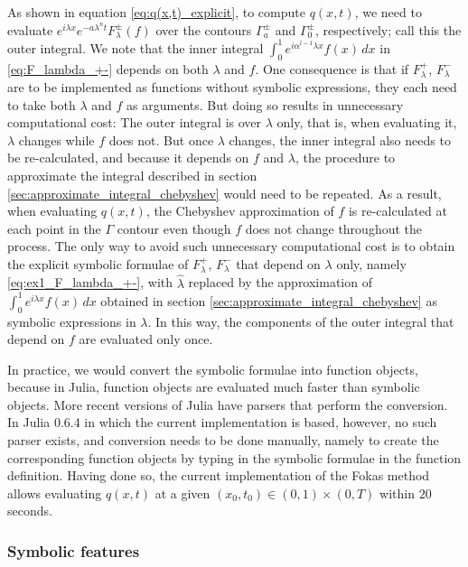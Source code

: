 \documentclass[11pt, oneside, a4paper]{article}
\begin{document}
As shown in equation \eqref{eq:q(x,t)_explicit}, to compute $q(x,t)$, we need to evaluate $e^{i\lambda x}e^{-a\lambda^n t}F_\lambda^\pm(f)$ over the contours $\Gamma_a^\pm$ and $\Gamma_0^\pm$, respectively; call this the outer integral. We note that the inner integral $\int_0^1 e^{i\alpha^{l-1}\lambda x}f(x)\,dx$ in \eqref{eq:F_lambda_+-} depends on both $\lambda$ and $f$. One consequence is that if $F_\lambda^+$, $F_\lambda^-$ are to be implemented as functions without symbolic expressions, they each need to take both $\lambda$ and $f$ as arguments. But doing so results in unnecessary computational cost: The outer integral is over $\lambda$ only, that is, when evaluating it, $\lambda$ changes while $f$ does not. But once $\lambda$ changes, the inner integral also needs to be re-calculated, and because it depends on $f$ and $\lambda$, the procedure to approximate the integral described in section \ref{sec:approximate_integral_chebyshev} would need to be repeated. As a result, when evaluating $q(x,t)$, the Chebyshev approximation of $f$ is re-calculated at each point in the $\Gamma$ contour even though $f$ does not change throughout the process. The only way to avoid such unnecessary computational cost is to obtain the explicit symbolic formulae of $F_\lambda^+$, $F_\lambda^-$ that depend on $\lambda$ only, namely \eqref{eq:ex1_F_lambda_+-}, with $\hat{\lambda}$ replaced by the approximation of $\int_0^1 e^{i\lambda x}f(x)\,dx$ obtained in section \ref{sec:approximate_integral_chebyshev} as symbolic expressions in $\lambda$. In this way, the components of the outer integral that depend on $f$ are evaluated only once. 

In practice, we would convert the symbolic formulae into function objects, because in Julia, function objects are evaluated much faster than symbolic objects. More recent versions of Julia have parsers that perform the conversion. In Julia 0.6.4 in which the current implementation is based, however, no such parser exists, and conversion needs to be done manually, namely to create the corresponding function objects by typing in the symbolic formulae in the function definition. Having done so, the current implementation of the Fokas method allows evaluating $q(x,t)$ at a given $(x_0, t_0)\in (0,1)\times (0,T)$ within $20$ seconds. 

\subsubsection{Symbolic features}
\end{document}
